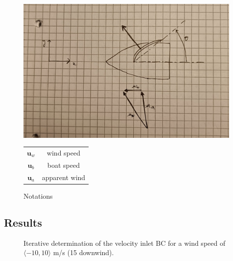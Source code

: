     \begin{figure}[ht!]
        \centering
        \begin{minipage}{0.65\textwidth}
            \includegraphics[width=0.99\textwidth]{figures/axes.jpeg}%
        \end{minipage}
        \begin{minipage}{0.34\textwidth}
            \vfill
            \begin{tabular}{c|c}
                $\mathbf{u}_w$ & wind speed \\
                $\mathbf{u}_b$ & boat speed \\
                $\mathbf{u}_a$ & apparent wind
            \end{tabular}
            \vfill
        \end{minipage}
        
        \caption{Notations}
        \label{fig:speedtriangle}
    \end{figure}

\clearpage
\subsection{Results}
    \begin{figure}[ht!]
        \centering
        \caption{Iterative determination of the velocity inlet BC for a wind speed of $\langle -10, 10\rangle$ m/s (15  downwind).}
        \label{fig:iterative_process}
    \end{figure}

